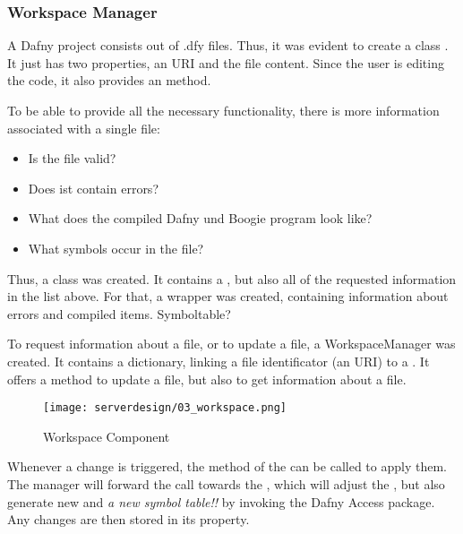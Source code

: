 

\subsubsection{Workspace Manager}
A Dafny project consists out of .dfy files.
Thus, it was evident to create a class .
It just has two properties, an URI and the file content.
Since the user is editing the code, it also provides an  method.

To be able to provide all the necessary functionality, there is more information associated with a single file:
\begin{itemize}
    \item Is the file valid?
    \item Does ist contain errors?
    \item What does the compiled Dafny und Boogie program look like?
    \item What symbols occur in the file? 
\end{itemize}



Thus, a class  was created.
It contains a , but also all of the requested information in the list above.
For that, a wrapper  was created, containing information about errors and compiled items.
Symboltable?

To request information about a file, or to update a file, a WorkspaceManager was created.
It contains a dictionary, linking a file identificator (an URI) to a .
It offers a method to update a file, but also to get information about a file.

\begin{figure}[H]
    \centering
    \texttt{[image: serverdesign/03\_workspace.png]}
    \caption{Workspace Component}
    \label{fig:server_workspace}
\end{figure}

Whenever a change is triggered, the  method of the  can be called to apply them.
The manager will forward the call towards the , which will adjust the , but also generate new  and \textit{a new symbol table!!} by invoking the Dafny Access package. Any changes are then stored in its  property.

